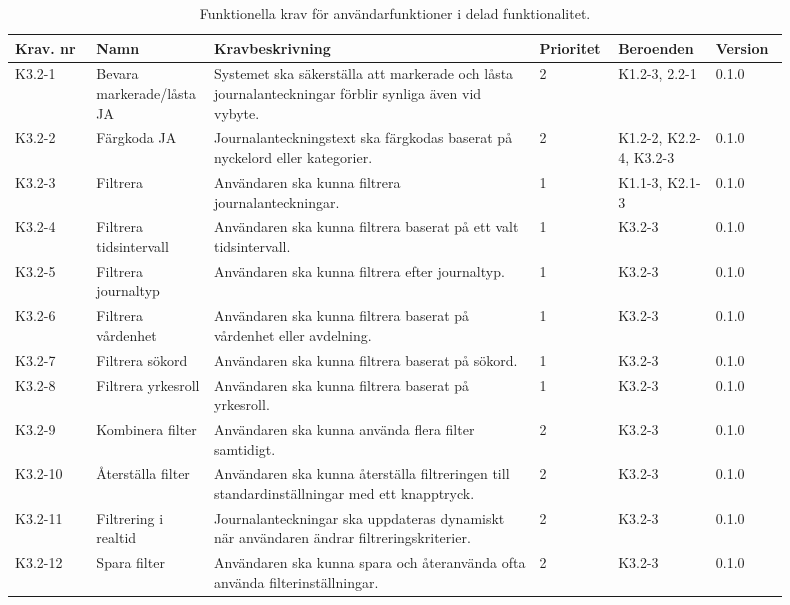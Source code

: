 \documentclass{article}
\begin{document}
\begin{table}[H]
    \caption{Funktionella krav för användarfunktioner i delad funktionalitet.} 
    \label{tab:användar_funktioner}
    \centering
    \begin{tabular}{|p{0.1\linewidth}|p{0.1\linewidth}|p{0.4\linewidth}|p{0.09\linewidth}|p{0.12\linewidth}|p{0.09\linewidth}|}
        \hline
        \textbf{Krav. nr} & \textbf{Namn} & \textbf{Kravbeskrivning} & \textbf{Prioritet} & \textbf{Beroenden}  & \textbf{Version} \\ \hline
        K3.2-1 & Bevara markerade/låsta JA & Systemet ska säkerställa att markerade och låsta journalanteckningar förblir synliga även vid vybyte. & 2 & K1.2-3, 2.2-1 & 0.1.0\\ \hline
        K3.2-2 & Färgkoda JA & Journalanteckningstext ska färgkodas baserat på nyckelord eller kategorier. & 2 & K1.2-2, K2.2-4, K3.2-3 & 0.1.0\\ \hline
        K3.2-3 & Filtrera & Användaren ska kunna filtrera journalanteckningar. & 1 & K1.1-3, K2.1-3 & 0.1.0\\ \hline
        K3.2-4 & Filtrera tidsintervall & Användaren ska kunna filtrera baserat på ett valt tidsintervall. & 1 & K3.2-3 & 0.1.0\\ \hline
        K3.2-5 & Filtrera journaltyp & Användaren ska kunna filtrera efter journaltyp. & 1 & K3.2-3 & 0.1.0\\ \hline
        K3.2-6 & Filtrera vårdenhet & Användaren ska kunna filtrera baserat på vårdenhet eller avdelning. & 1 & K3.2-3 & 0.1.0\\ \hline
        K3.2-7 & Filtrera sökord & Användaren ska kunna filtrera baserat på sökord. & 1 & K3.2-3 & 0.1.0\\ \hline
        K3.2-8 & Filtrera yrkesroll & Användaren ska kunna filtrera baserat på yrkesroll. & 1 & K3.2-3 & 0.1.0\\ \hline
        K3.2-9 & Kombinera filter & Användaren ska kunna använda flera filter samtidigt. & 2 & K3.2-3 & 0.1.0\\ \hline
        K3.2-10 & Återställa filter & Användaren ska kunna återställa filtreringen till standardinställningar med ett knapptryck. & 2 & K3.2-3 & 0.1.0\\ \hline
        K3.2-11 & Filtrering i realtid & Journalanteckningar ska uppdateras dynamiskt när användaren ändrar filtreringskriterier. & 2 &K3.2-3 & 0.1.0\\ \hline
        K3.2-12 & Spara filter & Användaren ska kunna spara och återanvända ofta använda filterinställningar. & 2 & K3.2-3 & 0.1.0\\ \hline

\end{tabular}
\end{table}
\end{document}
